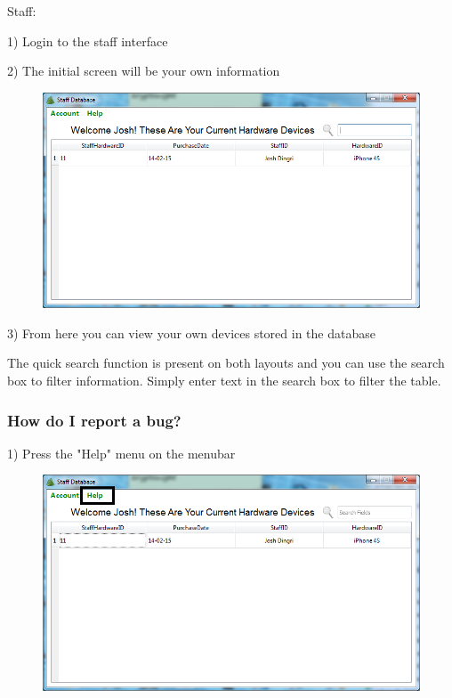 Staff:

1) Login to the staff interface

2) The initial screen will be your own information

\begin{figure}[H]
    \includegraphics[width=\textwidth]{./Manual/Images/myinfostaff.png}
\end{figure}

3) From here you can view your own devices stored in the database

The quick search function is present on both layouts and you can use the search box to filter information. Simply enter text in the search box to filter the table.

\subsubsection{How do I report a bug?}\label{bugreport}

1) Press the "Help" menu on the menubar

\begin{figure}[H]
    \includegraphics[width=\textwidth]{./Manual/Images/bugreport.png}
\end{figure}

